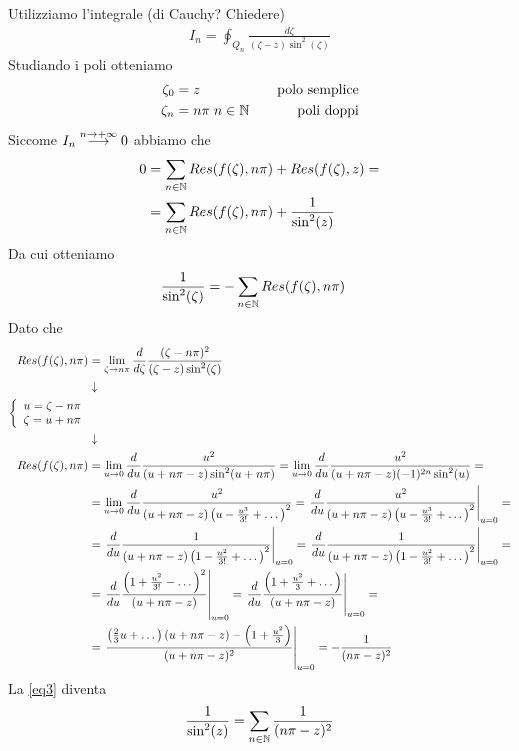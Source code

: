 Utilizziamo l'integrale (di Cauchy? Chiedere)
\begin{align}
	I_n = \oint_{Q_n} \frac{d\zeta}{(\zeta -z) \sin^2(\zeta)}
\end{align}
Studiando i poli otteniamo
\begin{align}
	\zeta_0 &= z \quad &\text{polo semplice}\\
	\zeta_n &= n\pi \; n\in \mathbb{N}  \quad &\text{poli doppi}
\end{align}
Siccome $I_n \overset{n \rightarrow +\infty}{\longrightarrow} 0$ abbiamo che
\begin{align}
	0 &= \sum_{n\in \mathbb{N}} Res(f(\zeta), n\pi) + Res(f(\zeta), z) =\nonumber\\
	  &= \sum_{n\in \mathbb{N}} Res(f(\zeta), n\pi) + \frac{1}{\sin^2(z)}  \label{eq3}
\end{align}
Da cui otteniamo
\begin{align}
	  \frac{1}{\sin^2(\zeta)} &= -\sum_{n\in \mathbb{N}} Res(f(\zeta), n\pi)
\end{align}
Dato che
\begin{align}
	Res(f(\zeta), n\pi) &= \underset{\zeta \rightarrow n\pi}{\lim} \, \frac{d}{d\zeta} \frac{(\zeta - n\pi)^2}{(\zeta - z) \sin^2(\zeta)} \\ &\downarrow \nonumber \\
	\left\{ \begin{array}{cc} u=\zeta - n\pi\\ \zeta = u + n\pi \end{array} \right. \nonumber \\ &\downarrow \nonumber \\
	Res(f(\zeta), n\pi) &= \underset{u \rightarrow 0}{\lim} \, \frac{d}{du} \frac{u^2}{(u + n\pi - z) \sin^2(u + n\pi)} =  \underset{u \rightarrow 0}{\lim} \, \frac{d}{du} \frac{u^2}{(u + n\pi - z) (-1)^{2n} \sin^2(u)}= \nonumber\\
	&= \underset{u \rightarrow 0}{\lim} \, \frac{d}{du} \frac{u^2}{(u + n\pi - z) \left(u -\frac{u^3}{3!} + \dots\right)^2} = \left. \frac{d}{du} \frac{u^2}{(u + n\pi - z) \left(u -\frac{u^3}{3!} + \dots\right)^2} \right|_{u=0} = \nonumber \\
	&= \left. \frac{d}{du} \frac{1}{(u + n\pi - z) \left(1 -\frac{u^2}{3!} + \dots\right)^2} \right|_{u=0} = \left. \frac{d}{du} \frac{1}{(u + n\pi - z) \left(1 -\frac{u^2}{3!} + \dots\right)^2} \right|_{u=0} = \nonumber \\
	&= \left. \frac{d}{du} \frac{\left(1 +\frac{u^2}{3!} - \dots\right)^2}{(u + n\pi - z) } \right|_{u=0} = \left. \frac{d}{du} \frac{\left(1 +\frac{u^2}{3} + \dots\right)}{(u + n\pi - z) } \right|_{u=0} = \nonumber \\
	&= \left. \frac{\left( \frac{2}{3} u + \dots \right) (u + n\pi-z ) - \left(1 + \frac{u^2}{3}\right)}{(u+ n\pi -z)^2} \right|_{u=0} = -\frac{1}{(n\pi -z)^2}
\end{align}
La \ref{eq3} diventa
\begin{align}
	\frac{1}{\sin^2(z)} = \sum_{n\in \mathbb{N}} \frac{1}{(n\pi -z)^2}
\end{align}

